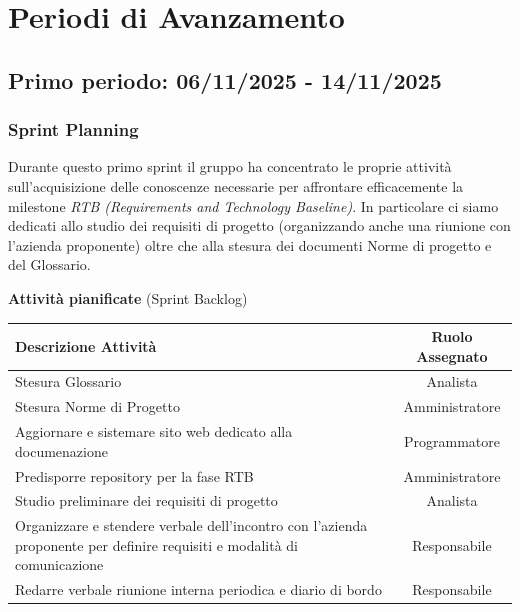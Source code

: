 \documentclass[a4paper, 11pt, oneside]{scrartcl} %
\begin{document}
\section{Periodi di Avanzamento}

\subsection{Primo periodo: 06/11/2025 - 14/11/2025}

\subsubsection*{Sprint Planning}

Durante questo primo sprint il gruppo ha concentrato le proprie attività
sull’acquisizione delle conoscenze necessarie per affrontare efficacemente la milestone \textit{RTB (Requirements and Technology Baseline)}.  
In particolare ci siamo dedicati allo studio dei requisiti di progetto (organizzando anche una riunione con l'azienda proponente) oltre che alla stesura dei documenti Norme di progetto e del Glossario.

\begin{table}[!ht]
\vspace{0.2cm}
\centering
{\large \textbf{Attività pianificate} (Sprint Backlog)} \\
\vspace{0.3cm}
\renewcommand{\arraystretch}{1.4}
\begin{tabularx}{\textwidth}{|X|c|} 
\hline
\rowcolor{white} 
\textbf{Descrizione Attività} & \textbf{Ruolo Assegnato} \\
\hline
Stesura Glossario & Analista \\
Stesura Norme di Progetto & Amministratore \\
Aggiornare e sistemare sito web dedicato alla documenazione & Programmatore \\
Predisporre repository per la fase RTB & Amministratore \\
Studio preliminare dei requisiti di progetto & Analista \\
Organizzare e stendere verbale dell'incontro con l'azienda proponente per definire requisiti e modalità di comunicazione & Responsabile  \\
Redarre verbale riunione interna periodica e diario di bordo & Responsabile \\
\hline
\end{tabularx}
\end{table}
\FloatBarrier
\end{document}
